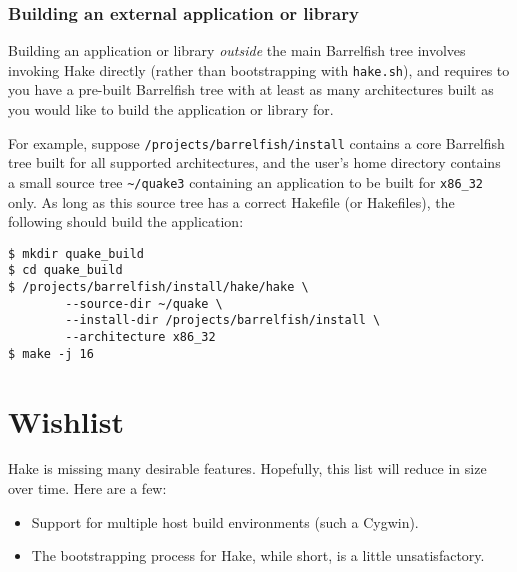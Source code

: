 \documentclass[a4paper,twoside]{report} %
\begin{document}
\subsection{Building an external application or library}

Building an application or library \emph{outside} the main Barrelfish
tree involves invoking Hake directly (rather than bootstrapping with
\texttt{hake.sh}), and requires to you have a pre-built Barrelfish
tree with at least as many architectures built as you would like to
build the application or library for.

For example, suppose \texttt{/projects/barrelfish/install} contains a
core Barrelfish tree built for all supported architectures, and the
user's home directory contains a small source tree
\verb!~/quake3! containing an application to be built for
\texttt{x86\_32} only.  As long as this source tree has a correct
Hakefile (or Hakefiles), the following should build the application:

\begin{verbatim}
$ mkdir quake_build
$ cd quake_build
$ /projects/barrelfish/install/hake/hake \
        --source-dir ~/quake \
        --install-dir /projects/barrelfish/install \
        --architecture x86_32
$ make -j 16
\end{verbatim}

\chapter{Wishlist}

Hake is missing many desirable features.  Hopefully, this list will
reduce in size over time.  Here are a few:

\begin{itemize}
\item Support for multiple host build environments (such a Cygwin). 
\item The bootstrapping process for Hake, while short, is a little
  unsatisfactory. 
\end{itemize}
\end{document}
